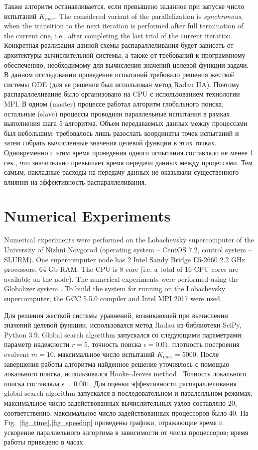 \documentclass{svproc}
\begin{document}
Также алгоритм останавливается, если превышено заданное при запуске число испытаний $K_{max}$.
The considered variant of the parallelization is \textit{synchronous}, when the transition to the next iteration is performed after full termination of the current one, i.e., after completing the last trial of the current iteration.
Конкретная реализация данной схемы распараллеливания будет зависеть от архитектуры вычислительной системы, а также от требований к программному обеспечению, необходимому для вычисления значений целевой функции задачи. В данном исследовании проведение испытаний требовало решения жесткой системы ODE (для ее решения был использован метод Radau IIA). Поэтому распараллеливание было организовано на CPU с использованием технологии MPI. В одном (master) процессе работал алгоритм глобального поиска; остальные (slave) процессы проводили параллельные испытания в рамках выполнения шага 5 алгоритма. Объем передаваемых данных между процессами был небольшим: требовалось лишь разослать координаты точек испытаний и затем собрать вычисленные значения целевой функции в этих точках. Одновременно с этим время проведения одного испытания составляло не менее 1 сек., что значительно превышает время передачи данных между процессами. Тем самым, накладные расходы на передачу данных не оказывали существенного влияния на эффективность распараллеливания.


\section{Numerical Experiments}\label{Sec_Exp}

Numerical experiments were performed on the Lobachevsky supercomputer of the University of Nizhni Novgorod (operating system -- CentOS 7.2, control system -- SLURM). One supercomputer node has 2 Intel Sandy Bridge E5-2660 2.2 GHz processors, 64 Gb RAM. The CPU is 8-core (i.e. a total of 16 CPU cores are available on the node). The numerical experiments were performed using the Globalizer system \cite{globalizerSystem}.
To build the system for running on the Lobachevsky supercomputer, the GCC 5.5.0 compiler and Intel MPI 2017 were used.

Для решения жесткой системы уравнений, возникающей при вычислении значений целевой функции, использовался метод Radau из библиотеки SciPy, Python 3.9.
Global search algorithm запускался со следующими параметрами: параметр надежности $r=5$, точность поиска $\epsilon = 0.01$, плотность построения evolvent $m=10$, максимальное число испытаний $K_{max}=5000$. После завершения работы алгоритма найденное решение уточнялось с помощью локального поиска, использовался Hooke--Jeeves method \cite{HookJeeves}. Точность локального поиска составляла $\epsilon = 0.001$. 
Для оценки эффективности распараллеливания global search algorithm запускался в последовательном и паралелльном режимах, максимальное число задействованных вычислительных узлов составляло 20, соответственно, максимальное число задействованных процессоров было 40.
На Fig.~\ref{fig_time},\ref{fig_speedup} приведены графики, отражающие время и ускорение параллельного алгортима в зависимости от числа процессоров; время работы приведено в часах.
\end{document}
